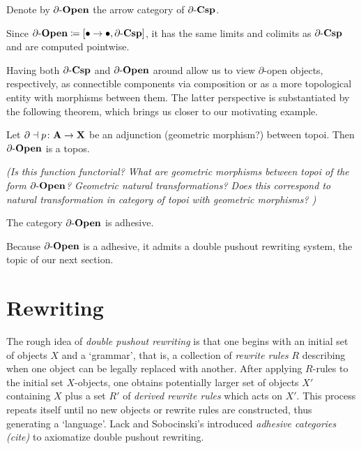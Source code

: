 \documentclass{amsart}
\begin{document}
\begin{df} \label{df:OpenObs}
	Denote by $ \partial \text{-} \mathbf{Open} $ the arrow category of $ \partial \text{-} \mathbf{Csp} $. 
\end{df}

\begin{remark} \label{thm:OpnObsLimits}
	Since $ \partial \text{-} \mathbf{Open} \coloneqq [\bullet \to \bullet , \partial \text{-} \mathbf{Csp} ]  $, it has the same limits and colimits as $ \partial \text{-} \mathbf{Csp} $ and are computed pointwise.
\end{remark}

Having both $ \partial \text{-} \mathbf{Csp} $ and $ \partial \text{-} \mathbf{Open} $ around allow us to view $ \partial $-open objects, respectively, as connectible components via composition or as a more topological entity with morphisms between them. The latter perspective is substantiated by the following theorem, which brings us closer to our motivating example.

\begin{thm} \label{thm:OpenObTopos}
	Let $ \partial \dashv p \colon \mathbf{A} \to \mathbf{X} $ be an adjunction (geometric morphism?) between topoi.  Then $ \partial \text{-} \mathbf{Open} $ is a topos.  
\end{thm}

{\color{red}\emph{(Is this function functorial?  What are geometric morphisms between topoi of the form $ \partial \text{-} \mathbf{Open} $?  Geometric natural transformations?  Does this correspond to natural transformation in category of topoi with geometric morphisms?  )}}

\begin{cor} \label{thm:OpenObAdhsv}
	The category $ \partial \text{-} \mathbf{Open} $ is adhesive.
\end{cor}

Because $ \partial \text{-} \mathbf{Open} $ is a adhesive, it admits a double pushout rewriting system, the topic of our next section.

\section{Rewriting}
\label{sec:Rewriting}

The rough idea of \emph{double pushout rewriting} is that one begins with an initial set of objects $ X $ and a `grammar', that is, a collection of \emph{rewrite rules} $ R $ describing when one object can be legally replaced with another.  After applying $ R $-rules to the initial set $ X $-objects, one obtains potentially larger set of objects $ X' $ containing $ X $ plus a set $ R' $ of \emph{derived rewrite rules} which acts on $ X' $. This process repeats itself until no new objects or rewrite rules are constructed, thus generating a `language'.  Lack and Sobocinski's introduced \emph{adhesive categories} \emph{(cite)} to axiomatize double pushout rewriting.  
\end{document}
